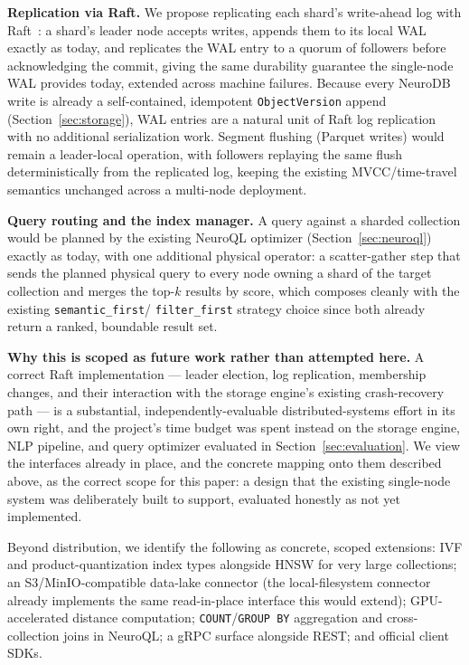 \documentclass[conference]{IEEEtran}
\begin{document}
\textbf{Replication via Raft.} We propose replicating each shard's write-ahead log with
Raft~\cite{ongaro2014raft}: a shard's leader node accepts writes, appends them to its local
WAL exactly as today, and replicates the WAL entry to a quorum of followers before
acknowledging the commit, giving the same durability guarantee the single-node WAL provides
today, extended across machine failures. Because every NeuroDB write is already a
self-contained, idempotent \texttt{ObjectVersion} append (Section~\ref{sec:storage}), WAL
entries are a natural unit of Raft log replication with no additional serialization work.
Segment flushing (Parquet writes) would remain a leader-local operation, with followers
replaying the same flush deterministically from the replicated log, keeping the existing
MVCC/time-travel semantics unchanged across a multi-node deployment.

\textbf{Query routing and the index manager.} A query against a sharded collection would be
planned by the existing NeuroQL optimizer (Section~\ref{sec:neuroql}) exactly as today, with
one additional physical operator: a scatter-gather step that sends the planned physical
query to every node owning a shard of the target collection and merges the top-$k$ results
by score, which composes cleanly with the existing \texttt{semantic\_first}/
\texttt{filter\_first} strategy choice since both already return a ranked, boundable result
set.

\textbf{Why this is scoped as future work rather than attempted here.} A correct Raft
implementation --- leader election, log replication, membership changes, and their
interaction with the storage engine's existing crash-recovery path --- is a substantial,
independently-evaluable distributed-systems effort in its own right, and the project's time
budget was spent instead on the storage engine, NLP pipeline, and query optimizer evaluated
in Section~\ref{sec:evaluation}. We view the interfaces already in place, and the concrete
mapping onto them described above, as the correct scope for this paper: a design that the
existing single-node system was deliberately built to support, evaluated honestly as not
yet implemented.

Beyond distribution, we identify the following as concrete, scoped extensions: IVF and
product-quantization index types alongside HNSW for very large collections; an
S3/MinIO-compatible data-lake connector (the local-filesystem connector already implements
the same read-in-place interface this would extend); GPU-accelerated distance computation;
\texttt{COUNT}/\texttt{GROUP BY} aggregation and cross-collection joins in NeuroQL; a gRPC
surface alongside REST; and official client SDKs.
\end{document}
